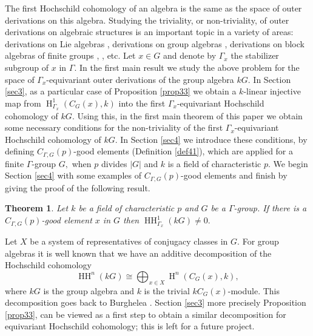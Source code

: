 \documentclass[pdflatex,sn-mathphys-num]{sn-jnl}
\numberwithin{equation}{section}
\theoremstyle{thmstyleone}
\newtheorem{theorem}{Theorem}
\theoremstyle{thmstyletwo}
\theoremstyle{thmstylethree}
\newcommand{\Hrm}{\operatorname{H}}
\newcommand{\HH}{\operatorname{HH}}
\begin{document}
The first Hochschild cohomology of an algebra is the same as the space of outer derivations on this algebra.  Studying the triviality, or non-triviality, of outer derivations on algebraic structures is an important topic in a variety of areas: derivations on Lie algebras \cite{Ja}, derivations on group algebras \cite{Ar}, derivations on block algebras of finite groups \cite[Section 7]{Li22}, \cite{Br}, etc. Let $x\in G$ and denote by $\Gamma_x$ the stabilizer subgroup of $x$ in $\Gamma.$  In the first main result we study the above problem for the space of $\Gamma_x$-equivariant outer derivations of the group algebra $kG$. In Section \ref{sec3}, as a particular case of Proposition \ref{prop33} we obtain a $k$-linear injective map from  $\Hrm_{\Gamma_x}^1(C_G(x),k)$ into the
first $\Gamma_x$-equivariant Hochschild cohomology of $kG.$  Using this, in the first main theorem of this paper we obtain some necessary conditions for the non-triviality of the first $\Gamma_x$-equivariant Hochschild cohomology of $kG.$ In Section \ref{sec4} we introduce these conditions, by  defining  $C_{\Gamma,G}(p)$-good elements (Definition \ref{def41}), which are applied  for a finite $\Gamma$-group $G,$ when $p$ divides $|G|$ and $k$ is a field of characteristic $p.$ We begin Section \ref{sec4} with some examples of $C_{\Gamma,G}(p)$-good elements and finish by giving the proof of the following result.

\begin{theorem}\label{thm11}
Let $k$ be a field of characteristic $p$ and $G$ be a $\Gamma$-group.
 If there is a $C_{\Gamma,G}(p)$-good element $x$ in $G$ then $\HH_{\Gamma_x}^1(kG)\neq 0.$
\end{theorem}
Let $X$ be a system of representatives of conjugacy classes in $G.$ For group algebras it is well known that we have an additive decomposition of the  Hochschild cohomology
    $$\HH^n(kG)\cong \bigoplus_{x\in X}\Hrm^n(C_G(x),k),$$
where $kG$ is the group algebra and $k$ is the trivial $kC_G(x)$-module. This decomposition goes back to Burghelea \citep{Bu}. Section \ref{sec3} more precisely Proposition \ref{prop33}, can be viewed  as a first step to obtain a similar decomposition for equivariant Hochschild cohomology; this is left for a future project.
\end{document}
